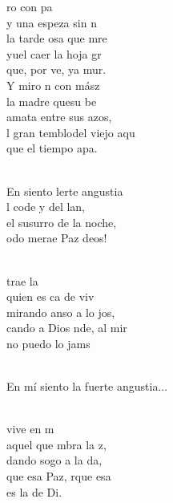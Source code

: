 \documentclass[12pt]{article}
\begin{document}
\begin{multicols*}{2}
\begin{cancion}%
	ro con pa \\
	y una espeza sin n  \\
	la tarde osa que mre\\
	yuel caer  la hoja gr\\
	que, por ve, ya mur.\\
	Y miro n con mász\\
	la madre quesu be  \\
	amata entre sus azos,\\
	l gran temblodel viejo aqu\\
	que el tiempo apa. \\\jump\\
	\begin{chorus}%
	En siento lerte angustia\\
	l code y del lan, \\
	el susurro de la noche,\\
	odo merae Paz deos!\\
	\end{chorus}%
	\jump\\
	 trae la  \\
	quien es ca de viv  \\
	mirando anso a lo jos,\\
	cando a Dios nde, al mir\\
	no puedo lo jams\\\jump\\
	\begin{chorus}%
En mí siento la fuerte angustia...\\
	\end{chorus}%
	\jump\\
	vive en m \\
	aquel que mbra la z,  \\
	dando sogo a la da,\\
	que esa Paz, rque esa \\
	es la  de Di.\\
\end{cancion}%


\end{multicols*}
\end{document}

